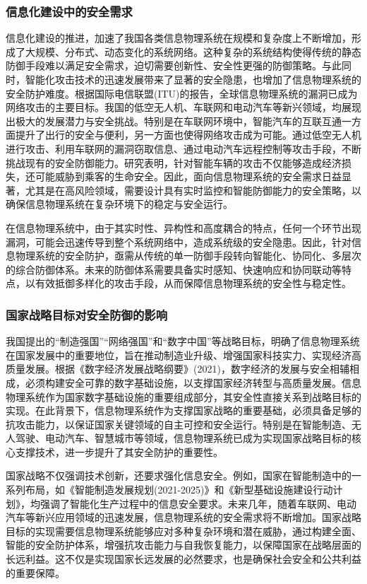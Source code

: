 \subsubsection{信息化建设中的安全需求}

信息化建设的推进，加速了我国各类信息物理系统在规模和复杂度上不断增加，形成了大规模、分布式、动态变化的系统网络。这种复杂的系统结构使得传统的静态防御手段难以满足安全需求，迫切需要创新性、安全性更强的防御策略。与此同时，智能化攻击技术的迅速发展带来了显著的安全隐患，也增加了信息物理系统的安全防护难度。根据国际电信联盟(ITU)的报告，全球信息物理系统的漏洞已成为网络攻击的主要目标。我国的低空无人机、车联网和电动汽车等新兴领域，均展现出极大的发展潜力与安全挑战。特别是在车联网环境中，智能汽车的互联互通一方面提升了出行的安全与便利，另一方面也使得网络攻击成为可能。通过低空无人机进行攻击、利用车联网的漏洞窃取信息、通过电动汽车远程控制等攻击手段，不断挑战现有的安全防御能力。研究表明，针对智能车辆的攻击不仅能够造成经济损失，还可能威胁到乘客的生命安全。因此，面向信息物理系统的安全需求日益显著，尤其是在高风险领域，需要设计具有实时监控和智能防御能力的安全策略，以确保信息物理系统在复杂环境下的稳定与安全运行。

在信息物理系统中，由于其实时性、异构性和高度耦合的特点，任何一个环节出现漏洞，可能会迅速传导到整个系统网络中，造成系统级的安全隐患。因此，针对信息物理系统的安全防护，亟需从传统的单一防御手段转向智能化、协同化、多层次的综合防御体系。未来的防御体系需要具备实时感知、快速响应和协同联动等特点，以有效抵御多样化的攻击手段，从而保障信息物理系统的安全性与稳定性。

\subsubsection{国家战略目标对安全防御的影响}

我国提出的“制造强国”“网络强国”和“数字中国”等战略目标，明确了信息物理系统在国家发展中的重要地位，旨在推动制造业升级、增强国家科技实力、实现经济高质量发展。根据《数字经济发展战略纲要》(2021)，数字经济的发展与安全相辅相成，必须构建安全可靠的数字基础设施，以支撑国家经济转型与高质量发展。信息物理系统作为国家数字基础设施的重要组成部分，其安全性直接关系到战略目标的实现。在此背景下，信息物理系统作为支撑国家战略的重要基础，必须具备足够的抗攻击能力，以保证国家关键领域的自主可控和安全运行。特别是在智能制造、无人驾驶、电动汽车、智慧城市等领域，信息物理系统已成为实现国家战略目标的核心支撑技术，进一步提升了其安全防护的重要性。

国家战略不仅强调技术创新，还要求强化信息安全。例如，国家在智能制造中的一系列布局，如《智能制造发展规划(2021-2025)》和《新型基础设施建设行动计划》，均强调了智能化生产过程中的信息安全要求。未来几年，随着车联网、电动汽车等新兴应用领域的迅速发展，信息物理系统的安全需求将不断增加。国家战略目标的实现需要信息物理系统能够应对多种复杂环境和潜在威胁，通过构建全面、智能的安全防护体系，增强抗攻击能力与自我恢复能力，以保障国家在战略层面的长远利益。这不仅是实现国家长远发展的必然要求，也是确保社会安全和公共利益的重要保障。

